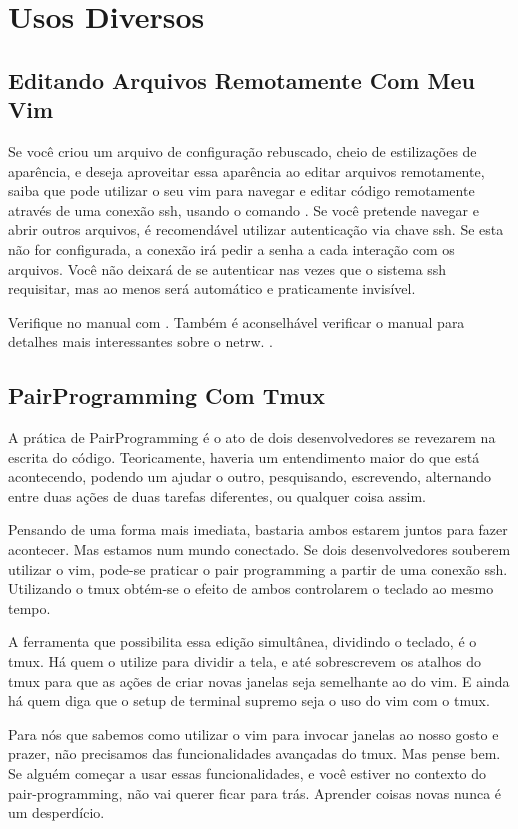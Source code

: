 \chapter{Usos Diversos}

\section{Editando Arquivos Remotamente Com Meu Vim}
Se você criou um arquivo de configuração rebuscado, cheio de estilizações de aparência, e deseja aproveitar essa aparência
ao editar arquivos remotamente, saiba que pode utilizar o seu vim para navegar e editar código remotamente através de uma
conexão ssh, usando o comando .
Se você pretende navegar e abrir outros arquivos, é recomendável utilizar autenticação via chave ssh.
Se esta não for configurada, a conexão irá pedir a senha a cada interação com os arquivos.
Você não deixará de se autenticar nas vezes que o sistema ssh requisitar, mas ao menos será
automático e praticamente invisível.

Verifique no manual com .
Também é aconselhável verificar o manual para detalhes mais interessantes sobre o netrw. .

\section{PairProgramming Com Tmux}
A prática de PairProgramming é o ato de dois desenvolvedores se revezarem na escrita do código.
Teoricamente, haveria um entendimento maior do que está acontecendo, podendo um ajudar o outro,
pesquisando, escrevendo, alternando entre duas ações de duas tarefas diferentes, ou qualquer coisa assim.

Pensando de uma forma mais imediata, bastaria ambos estarem juntos para fazer acontecer.
Mas estamos num mundo conectado.
Se dois desenvolvedores souberem utilizar o vim, pode-se praticar o pair programming a partir de uma conexão ssh.
Utilizando o tmux obtém-se o efeito de ambos controlarem o teclado ao mesmo tempo.

A ferramenta que possibilita essa edição simultânea, dividindo o teclado, é o tmux.
Há quem o utilize para dividir a tela, e até sobrescrevem os atalhos do tmux para que as ações de criar novas janelas
seja semelhante ao do vim.
E ainda há quem diga que o setup de terminal supremo seja o uso do vim com o tmux.

Para nós que sabemos como utilizar o vim para invocar janelas ao nosso gosto e prazer, não precisamos
das funcionalidades avançadas do tmux.
Mas pense bem.
Se alguém começar a usar essas funcionalidades,
e você estiver no contexto do pair-programming, não vai querer ficar para trás.
Aprender coisas novas nunca é um desperdício.

